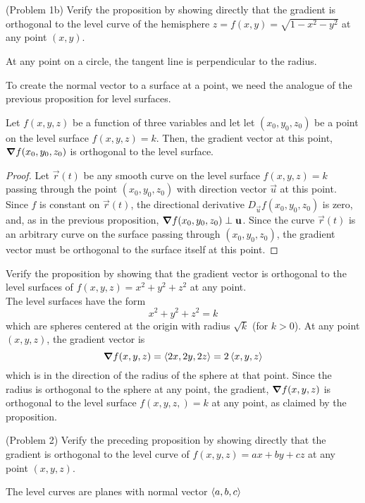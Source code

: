 \documentclass[handout]{ximera}
\begin{document}
\begin{problem}(Problem 1b)
Verify the proposition by showing directly that the gradient is orthogonal to the level curve  of the hemisphere $z = f(x,y) = \sqrt{1 - x^2 - y^2}$ at any point $(x,y)$.
\begin{hint}
At any point on a circle, the tangent line is perpendicular to the radius.
\end{hint}
\end{problem}

To create the normal vector to a surface at a point, we need the analogue of the previous proposition for level surfaces.

\begin{proposition}
Let $f(x,y,z)$ be a function of three variables and let let $(x_0, y_0, z_0)$ be a point on the level surface $f(x,y, z) = k$.
Then, the gradient vector at this point, $\boldsymbol\nabla f(x_0, y_0, z_0)$ is orthogonal to the level surface.
\end{proposition}
\begin{proof}
Let $\vec r(t)$ be any smooth curve on the level surface $f(x,y, z) = k$ passing through the point $(x_0, y_0, z_0)$ with direction vector $\vec u$ at this point.
Since $f$ is constant on $\vec r(t)$, the directional derivative $D_{\vec u} f(x_0, y_0, z_0)$ is zero, and, as in the previous proposition, 
$\boldsymbol\nabla f(x_0, y_0, z_0) \perp \mathbf u$.  
Since the curve $\vec r(t)$ is an arbitrary curve on the surface passing through $(x_0, y_0, z_0)$, the gradient vector must be 
orthogonal to the surface itself at this point.
\end{proof}

\begin{example}[Example 2]
Verify the proposition by showing that the gradient vector is orthogonal to the level surfaces of $f(x, y, z) = x^2 + y^2 + z^2$ at any point.\\
The level surfaces have the form
\[
x^2 + y^2 + z^2 = k
\]
which are spheres centered at the origin with radius $\sqrt k$ (for $k>0$).
At any point $(x, y, z)$, the gradient vector is
\[
\boldsymbol\nabla f(x, y, z) = \left\langle 2x, 2y, 2z\right\rangle = 2\left\langle x, y, z\right\rangle
\]
which is in the direction of the radius of the sphere at that point. Since the radius is orthogonal to the sphere at any point,
the gradient, $\boldsymbol\nabla f(x,y,z)$ is orthogonal to the level surface $f(x, y, z,) = k$ at any point, as claimed by the proposition.
\end{example}

\begin{problem}(Problem 2)
Verify the preceding proposition by showing directly that the gradient is orthogonal to the level curve  of $f(x,y, z) = ax + by + cz$ at any point $(x,y, z)$.
\begin{hint}
The level curves are planes with normal vector $\left\langle a, b, c\right\rangle$
\end{hint}
\end{problem}
\end{document}
